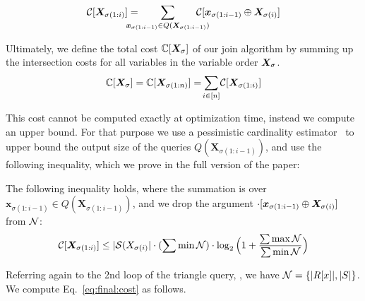 \begin{equation*}
  \Restrict{\Cost}{\VTXPP{1:i}} = \qquad \smashoperator[lr]{\sum_{\ctxpp{1:i-1} \in Q(\bm X_{\sigma(1:i-1)})}} \qquad \Restrict{\Cost}{\Concat{\ctxpp{1:i-1}}{\VTXPP{i}}} 
\end{equation*}

Ultimately, we define the total cost $\mathbb{C}[\bm{X}_\sigma]$ of our join algorithm by summing up the intersection costs for all variables in the variable order $\bm{X}_\sigma$. 
\begin{equation*}
  \TotalCost[\VTXP] = \TotalCost[\VTXPP{1:n}] = \smashoperator[lr]{\sum_{i \in [n]}} \Restrict{\Cost}{\VTXPP{1:i}} 
\end{equation*}

This cost cannot be computed exactly at optimization time, instead we
compute an upper bound.  For that purpose we use a pessimistic
cardinality
estimator~\cite{DBLP:conf/sigmod/CaiBS19,DBLP:journals/pacmmod/KhamisNOS24,10.1145/3651597}
to upper bound the output size of the
queries $Q(\bm X_{\sigma(1:i-1)})$, and use the following inequality,
which we prove in the full version of the paper:

\begin{lemma}\label{lem:cost-ub}
The following inequality holds, 
where the summation is over $\bm x_{\sigma(1:i-1)} \in Q(\bm
X_{\sigma(1:i-1)})$, and we drop the argument
${\cdot}[{{\bm{x}_{\sigma({1:i-1})}} \oplus {\bm{X}_{\sigma({i})}}}]$ from $\mathcal{N}$:
  \begin{equation}
    {\ensuremath{\mathcal{C}}}[{{\bm{X}_{\sigma({1:i})}}}] \leq |\mathcal{S}(X_{\sigma(i)}| \cdot (\sum \min \mathcal{N}) \cdot \log_2\Big(1 + \frac{\sum \max \mathcal{N}}{\sum \min \mathcal{N}}\Big)\label{eq:final:cost}
  \end{equation}
\end{lemma}

\begin{example}
  Referring again to the 2nd loop of the triangle query,
  , we have $\mathcal{N} = \{|R[x]|, |S|\}$.  We
  compute Eq.~\eqref{eq:final:cost} as follows.  

\end{example}

